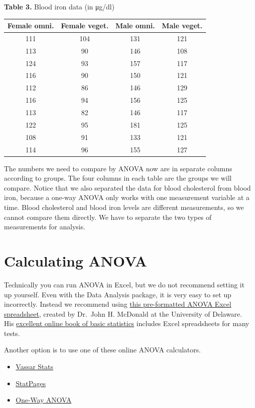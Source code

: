 \documentclass[
]{book}
\providecommand{\tightlist}{%
  \setlength{\itemsep}{0pt}\setlength{\parskip}{0pt}}
\begin{document}
\textbf{Table 3.} Blood iron data (in μg/dl)

\begin{longtable}[]{@{}cccc@{}}
\toprule
Female omni. & Female veget. & Male omni. & Male veget. \\
\midrule
\endhead
111 & 104 & 131 & 121 \\
113 & 90 & 146 & 108 \\
124 & 93 & 157 & 117 \\
116 & 90 & 150 & 121 \\
112 & 86 & 146 & 129 \\
116 & 94 & 156 & 125 \\
113 & 82 & 146 & 117 \\
122 & 95 & 181 & 125 \\
108 & 91 & 133 & 121 \\
114 & 96 & 155 & 127 \\
\bottomrule
\end{longtable}

The numbers we need to compare by ANOVA now are in separate columns according to groups. The four columns in each table are the groups we will compare. Notice that we also separated the data for blood cholesterol from blood iron, because a one-way ANOVA only works with one measurement variable at a time. Blood cholesterol and blood iron levels are different measurements, so we cannot compare them directly. We have to separate the two types of measurements for analysis.

\hypertarget{calculating-anova}{%
\section{Calculating ANOVA}\label{calculating-anova}}

Technically you can run ANOVA in Excel, but we do not recommend setting it up yourself. Even with the Data Analysis package, it is very easy to set up incorrectly. Instead we recommend using \href{http://www.biostathandbook.com/anova.xls}{this pre-formatted ANOVA Excel spreadsheet}, created by Dr.~John H. McDonald at the University of Delaware. His \href{http://www.biostathandbook.com}{excellent online book of basic statistics} includes Excel spreadsheets for many tests.

Another option is to use one of these online ANOVA calculators.

\begin{itemize}
\tightlist
\item
  \href{http://vassarstats.net/anova1u.html}{Vassar Stats}
\item
  \href{https://statpages.info/anova1sm.html}{StatPages}
\item
  \href{https://goodcalculators.com/one-way-anova-calculator/}{One-Way ANOVA}
\end{itemize}
\end{document}

